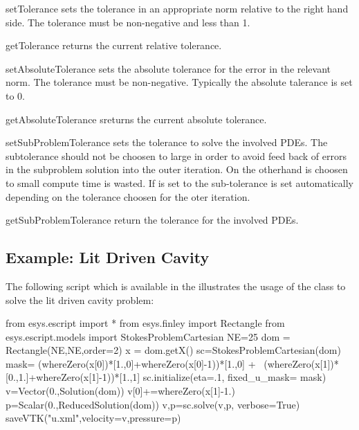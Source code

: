 \begin{methoddesc}[StokesProblemCartesian]{setTolerance}{}
sets the tolerance in an appropriate norm relative to the right hand side. The tolerance must be non-negative and less than 1.
\end{methoddesc}
\begin{methoddesc}[StokesProblemCartesian]{getTolerance}{}
returns the current relative tolerance.
\end{methoddesc}
\begin{methoddesc}[StokesProblemCartesian]{setAbsoluteTolerance}{}
sets the absolute tolerance for the error in the relevant norm. The tolerance must be non-negative. Typically the
absolute talerance is set to 0.
\end{methoddesc}
\begin{methoddesc}[StokesProblemCartesian]{getAbsoluteTolerance}{}
sreturns the current absolute tolerance.
\end{methoddesc}
\begin{methoddesc}[StokesProblemCartesian]{setSubProblemTolerance}{}
sets the tolerance to solve the involved PDEs. The subtolerance  should not be choosen to large 
in order to avoid feed back of errors in the subproblem solution into the outer iteration.
On the otherhand is choosen to small compute time is wasted.
If  is set to  the sub-tolerance is set automatically depending on the 
tolerance choosen for the oter iteration.
\end{methoddesc}
\begin{methoddesc}[StokesProblemCartesian]{getSubProblemTolerance}{}
return the tolerance for the involved PDEs.
\end{methoddesc}

\subsection{Example: Lit Driven Cavity}
 The following script  
 which is available in the \ExampleDirectory
illustrates the usage of the  class to solve
the lit driven cavity problem:
\begin{python}
from esys.escript import *
from esys.finley import Rectangle
from esys.escript.models import StokesProblemCartesian
NE=25
dom = Rectangle(NE,NE,order=2)
x = dom.getX()
sc=StokesProblemCartesian(dom)
mask= (whereZero(x[0])*[1.,0]+whereZero(x[0]-1))*[1.,0] + \
      (whereZero(x[1])*[0.,1.]+whereZero(x[1]-1))*[1.,1]
sc.initialize(eta=.1, fixed_u_mask= mask)
v=Vector(0.,Solution(dom))
v[0]+=whereZero(x[1]-1.)
p=Scalar(0.,ReducedSolution(dom))
v,p=sc.solve(v,p, verbose=True)
saveVTK("u.xml",velocity=v,pressure=p)
\end{python}

